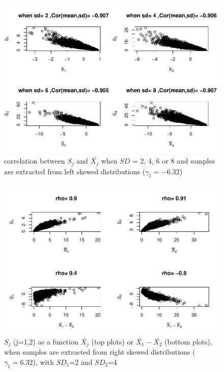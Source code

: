 \documentclass[
  man]{apa6}
\begin{document}
\begin{figure}
\centering
\includegraphics{Correlation_files/figure-latex/Hetbalcorasafctofn2-1.pdf}
\caption{\label{fig:Hetbalcorasafctofn2}correlation between \(S_j\) and \(\bar{X_j}\) when \(SD\) = 2, 4, 6 or 8 and samples are extracted from left skewed distributions (\(\gamma_1 = -6.32\))}
\end{figure}

\begin{figure}
\centering
\includegraphics{Correlation_files/figure-latex/pltSDHetbalRskew-1.pdf}
\caption{\label{fig:pltSDHetbalRskew}\(S_j\) (j=1,2) as a function \(\bar{X_j}\) (top plots) or \(\bar{X_1}-\bar{X_2}\) (bottom plots), when samples are extracted from right skewed distributions (\(\gamma_1 = 6.32\)), with \(SD_1\)=2 and \(SD_2\)=4}
\end{figure}
\end{document}
